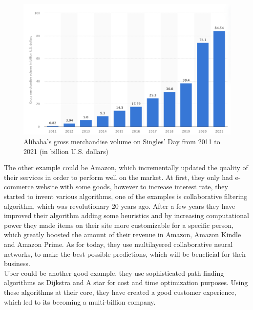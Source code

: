 \begin{figure}[h]
    \centering
    \includegraphics[scale=0.6]{figures/alibaba.png}
    \caption{Alibaba's gross merchandise volume on Singles' Day from 2011 to 2021 (in billion U.S. dollars)}
    \label{fig:gp}
\end{figure}

The other example could be Amazon, which incrementally updated the quality of their services in order to perform well on the market. At first, they only had e-commerce website with some goods, however to increase interest rate, they started to invent various algorithms, one of the examples is collaborative filtering algorithm, which was revolutionary 20 years ago. After a few years they have improved their algorithm adding some heuristics and by increasing computational power they made items on their site more customizable for a specific person, which greatly boosted the amount of their revenue in Amazon, Amazon Kindle and Amazon Prime. As for today, they use multilayered collaborative neural networks, to make the best possible predictions, which will be beneficial for their business.\\

Uber could be another good example, they use sophisticated path finding algorithms as Dijkstra and A star for cost and time optimization purposes. Using these algorithms at their core, they have created a good customer experience, which led to its becoming a multi-billion company.
